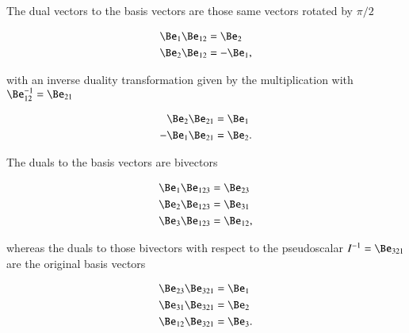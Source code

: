 %
%


The dual vectors to the  basis vectors are those same vectors rotated by \( \pi/2 \)

\begin{dmath}\label{eqn:definitions:360}
\begin{aligned}
\Be_1 \Be_{12} &= \Be_2 \\
\Be_2 \Be_{12} &= -\Be_1,
\end{aligned}
\end{dmath}

with an inverse duality transformation given by the multiplication with \( \Be_{12}^{-1} = \Be_{21} \)

\begin{dmath}\label{eqn:definitions:440}
\begin{aligned}
\Be_2 \Be_{21} &= \Be_1 \\
-\Be_1 \Be_{21} &= \Be_2.
\end{aligned}
\end{dmath}

The  duals to the basis vectors are bivectors

\begin{dmath}\label{eqn:definitions:380}
\begin{aligned}
\Be_1 \Be_{123} &= \Be_{23} \\
\Be_2 \Be_{123} &= \Be_{31} \\
\Be_3 \Be_{123} &= \Be_{12},
\end{aligned}
\end{dmath}

whereas the duals to those bivectors with respect to the pseudoscalar \( I^{-1} = \Be_{321} \) are the original basis vectors

\begin{dmath}\label{eqn:definitions:400}
\begin{aligned}
\Be_{23} \Be_{321} &= \Be_1 \\
\Be_{31} \Be_{321} &= \Be_2 \\
\Be_{12} \Be_{321} &= \Be_3.
\end{aligned}
\end{dmath}

